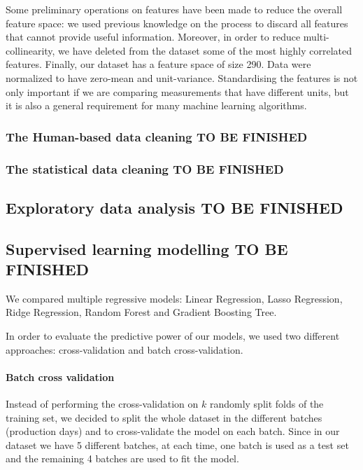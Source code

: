 Some preliminary operations on features have been made to reduce the overall feature space: we used previous knowledge on the process to discard all features that cannot provide useful information. Moreover, in order to reduce multi-collinearity, we have deleted from the dataset some of the most highly correlated features. Finally, our dataset has a feature space of size 290. Data were normalized to have zero-mean and unit-variance. Standardising the features is not only important if we are comparing measurements that have different units, but it is also a general requirement for many machine learning algorithms.

\subsubsection{The Human-based data cleaning TO BE FINISHED}

\subsubsection{The statistical data cleaning TO BE FINISHED}

\subsection{Exploratory data analysis TO BE FINISHED}



\subsection{Supervised learning modelling TO BE FINISHED}


We compared multiple regressive models: Linear Regression, Lasso Regression, Ridge Regression, Random Forest and Gradient Boosting Tree. 

In order to evaluate the predictive power of our models, we used two different approaches: cross-validation and batch cross-validation. 

\paragraph{Batch cross validation}
Instead of performing the cross-validation on $k$ randomly split folds of the training set, we decided to split the whole dataset in the different batches (production days) and to cross-validate the model on each batch. Since in our dataset we have 5 different batches, at each time, one batch is used as a test set and the remaining 4 batches are used to fit the model.

